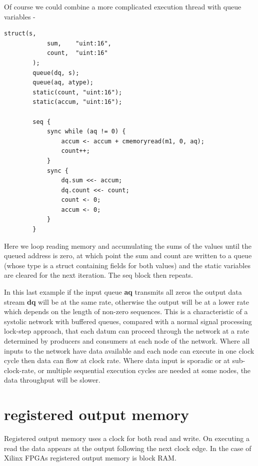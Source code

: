 \documentclass[10pt,a4paper,twoside,fleqn]{article}
\newcommand{\var}[1]{{\bf #1}} %
\begin{document}
\pagebreak
    Of course we could combine a more complicated execution thread
    with queue variables -
    \begin{lstlisting}[language=threepl]
        struct(s,
            sum,    "uint:16",
            count,  "uint:16"
        );
        queue(dq, s);
        queue(aq, atype);
        static(count, "uint:16");
        static(accum, "uint:16");

        seq {
            sync while (aq != 0) {
                accum <- accum + cmemoryread(m1, 0, aq);
                count++;
            }
            sync {
                dq.sum <<- accum;
                dq.count <<- count;
                count <- 0;
                accum <- 0;
            }
        }
    \end{lstlisting}
    Here we loop reading memory and accumulating the sums of the values until
    the queued address is zero, at which point the sum and count are written
    to a queue (whose type is a struct containing fields for both values) and
    the static variables are cleared for the next iteration. The seq block then
    repeats.
    
    In this last example if the input queue \var{aq} transmits all zeros the
    output data stream \var{dq} will be at the same rate, otherwise the output
    will be at a lower rate which depends on the length of non-zero sequences.
    This is a characteristic of a systolic network with buffered queues, compared
    with a normal signal processing lock-step approach, that each datum can
    proceed through the network at a rate determined by producers and consumers
    at each node of the network. Where all inputs to the network have data available
    and each node can execute in one clock cycle then data can flow at clock rate.
    Where data input is sporadic or at sub-clock-rate, or multiple sequential
    execution cycles are needed at some nodes, the data throughput will be slower.
    
    


\section{registered output memory}

    Registered output memory uses a clock for both read and write. On executing a
    read the data appears at the output following the next clock edge. In the case
    of Xilinx FPGAs registered output memory is block RAM.
    
\end{document}
